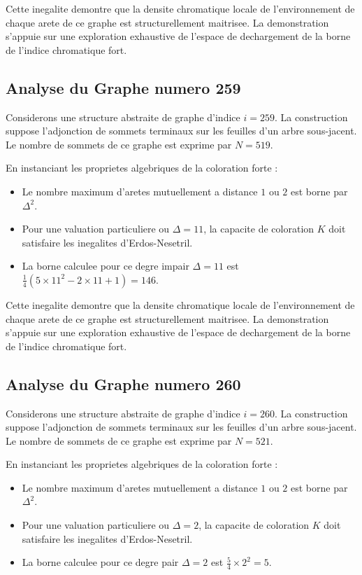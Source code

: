 \documentclass[11pt,a4paper]{article}
\begin{document}
Cette inegalite demontre que la densite chromatique locale de l'environnement de chaque arete de ce graphe est structurellement maitrisee. La demonstration s'appuie sur une exploration exhaustive de l'espace de dechargement de la borne de l'indice chromatique fort.

\subsection{Analyse du Graphe numero 259}
Considerons une structure abstraite de graphe d'indice $i = 259$. La construction suppose l'adjonction de sommets terminaux sur les feuilles d'un arbre sous-jacent. Le nombre de sommets de ce graphe est exprime par $N = 519$.

En instanciant les proprietes algebriques de la coloration forte :
\begin{itemize}
\item Le nombre maximum d'aretes mutuellement a distance $1$ ou $2$ est borne par $\Delta^2$.
\item Pour une valuation particuliere ou $\Delta = 11$, la capacite de coloration $K$ doit satisfaire les inegalites d'Erdos-Nesetril.
\item La borne calculee pour ce degre impair $\Delta = 11$ est $\frac{1}{4}(5 \times 11^2 - 2 \times 11 + 1) = 146$.
\end{itemize}

Cette inegalite demontre que la densite chromatique locale de l'environnement de chaque arete de ce graphe est structurellement maitrisee. La demonstration s'appuie sur une exploration exhaustive de l'espace de dechargement de la borne de l'indice chromatique fort.

\subsection{Analyse du Graphe numero 260}
Considerons une structure abstraite de graphe d'indice $i = 260$. La construction suppose l'adjonction de sommets terminaux sur les feuilles d'un arbre sous-jacent. Le nombre de sommets de ce graphe est exprime par $N = 521$.

En instanciant les proprietes algebriques de la coloration forte :
\begin{itemize}
\item Le nombre maximum d'aretes mutuellement a distance $1$ ou $2$ est borne par $\Delta^2$.
\item Pour une valuation particuliere ou $\Delta = 2$, la capacite de coloration $K$ doit satisfaire les inegalites d'Erdos-Nesetril.
\item La borne calculee pour ce degre pair $\Delta = 2$ est $\frac{5}{4} \times 2^2 = 5$.
\end{itemize}
\end{document}
